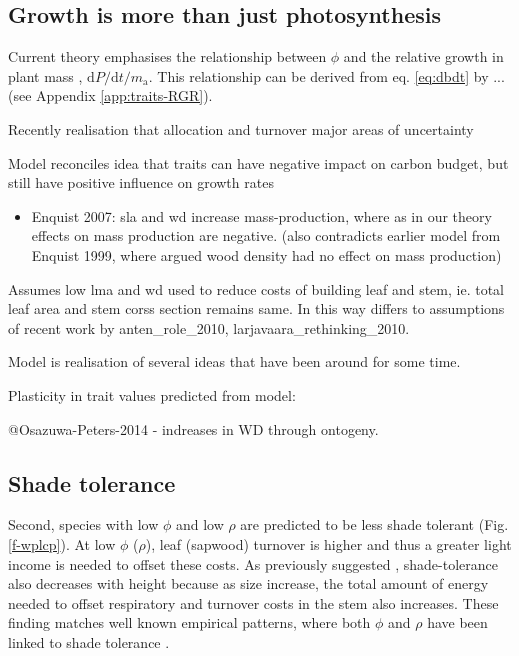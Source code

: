 \documentclass[12pt, a4paper]{article}
\begin{document}
\subsection{Growth is more than just photosynthesis}\label{tree-growth-is-more-than-just-photosynthesis}

Current theory emphasises the relationship between $\phi$ and the relative growth in plant mass
\citep{lambers-1992, cornelissen-1996, wright_cross-2000,  enquist-2007},
$\textrm{d}P / \textrm{d}t / m_\textrm{a}$. This relationship can be derived from eq. \ref{eq:dbdt}  by ...
(see Appendix \ref{app:traits-RGR}).

Recently realisation that allocation and turnover major areas of
uncertainty

Model reconciles idea that traits can have negative impact on carbon
budget, but still have positive influence on growth rates

\begin{itemize}
\itemsep1pt\parskip0pt
\item
  Enquist 2007: sla and wd increase mass-production, where as in our
  theory effects on mass production are negative. (also contradicts
  earlier model from Enquist 1999, where argued wood density had no
  effect on mass production)
\end{itemize}

Assumes low lma and wd used to reduce costs of building leaf and stem,
ie. total leaf area and stem corss section remains same. In this way
differs to assumptions of recent work by anten\_role\_2010,
larjavaara\_rethinking\_2010.

Model is realisation of several ideas that have been around for some
time.

Plasticity in trait values predicted from model:

@Osazuwa-Peters-2014 - indreases in WD through ontogeny.

\subsection{Shade tolerance}\label{shade-tolerance}

Second, species with low $\phi$ and low $\rho$ are predicted to be
less shade tolerant (Fig. \ref{f-wplcp}). At low $\phi$ ($\rho$),
leaf (sapwood) turnover is higher and thus a greater light income is
needed to offset these costs. As previously suggested
 \citep{givnish-1988}, shade-tolerance also decreases with
height because as size increase, the total amount of energy needed to
offset respiratory and turnover costs in the stem also increases. These
finding matches well known empirical patterns, where both $\phi$ and
$\rho$ have been linked to shade tolerance \citep{poorter-2006, lusk-2008,osunkoya-1996}.
\end{document}
